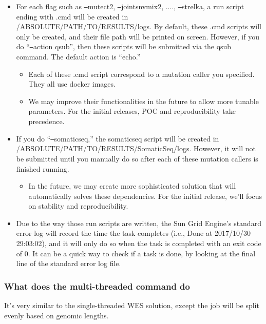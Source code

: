 \documentclass[10pt,letterpaper]{article}
\begin{document}
\begin{sloppypar}
\begin{itemize}
  \item
  For each flag such as \texttt{--}mutect2, \texttt{--}jointsnvmix2, ...., \texttt{--}strelka, a run script ending with .cmd will be created in /ABSOLUTE/PATH/TO/RESULTS/logs. By default, these .cmd scripts will only be created, and their file path will be printed on screen. However, if you do ``\texttt{--}action qsub'', then these scripts will be submitted via the qsub command. The default action is ``echo.''

    \begin{itemize}
    \item Each of these .cmd script correspond to a mutation caller you specified. They all use docker images.
    \item We may improve their functionalities in the future to allow more tunable parameters. For the initial releases, POC and reproducibility take precedence.
    \end{itemize}
  
  \item
  If you do ``\texttt{--}somaticseq,'' the somaticseq script will be created in /ABSOLUTE/PATH/TO/RESULTS/SomaticSeq/logs. However, it will not be submitted until you manually do so after each of these mutation callers is finished running. 
      
    \begin{itemize}
    \item   
     In the future, we may create more sophisticated solution that will automatically solves these dependencies. For the initial release, we'll focus on stability and reproducibility. 
    \end{itemize}
  
  \item
  Due to the way those run scripts are written, the Sun Grid Engine's standard error log will record the time the task completes (i.e., Done at 2017/10/30 29:03:02), and it will only do so when the task is completed with an exit code of 0. It can be a quick way to check if a task is done, by looking at the final line of the standard error log file.

\end{itemize}



\subsubsection{What does the multi-threaded command do}
It's very similar to the single-threaded WES solution, except the job will be split evenly based on genomic lengths.


\end{sloppypar}
\end{document}

